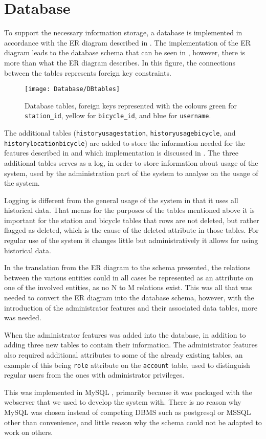 \section{Database}
To support the necessary information storage, a database is implemented in accordance with the ER diagram described in .
The implementation of the ER diagram leads to the database schema that can be seen in , however, there is more than what the ER diagram describes.
In this figure, the connections between the tables represents foreign key constraints.

\begin{figure}[h]
	\centering
	\texttt{[image: Database/DBtables]}
	\caption{Database tables, foreign keys represented with the colours green for \texttt{station_id}, yellow for \texttt{bicycle_id}, and blue for \texttt{username}.}\label{fig:Database-tables}
\end{figure}

The additional tables (\texttt{history\-usage\-station}, \texttt{history\-usage\-bicycle}, and \texttt{history\-lo\-ca\-ti\-on\-bi\-cy\-cle}) are added to store the information needed for the features described in  and which implementation is discussed in .
The three additional tables serves as a log, in order to store information about usage of the system, used by the administration part of the system to analyse on the usage of the system.

Logging is different from the general usage of the system in that it uses all historical data.
That means for the purposes of the tables mentioned above it is important for the station and bicycle tables that rows are not deleted, but rather flagged as deleted, which is the cause of the deleted attribute in those tables. 
For regular use of the system it changes little but administratively it allows for using historical data.

In the translation from the ER diagram to the schema presented, the relations between the various entities could in all cases be represented as an attribute on one of the involved entities, as no N to M relations exist.
This was all that was needed to convert the ER diagram into the database schema, however, with the introduction of the administrator features and their associated data tables, more was needed.

When the administrator features was added into the database, in addition to adding three new tables to contain their information.
The administrator features also required additional attributes to some of the already existing tables, an example of this being \texttt{role} attribute on the \texttt{account} table, used to distinguish regular users from the ones with administrator privileges.

This was implemented in MySQL \citep{misc:mysql}, primarily because it was packaged with the webserver that we used to develop the system with.
There is no reason why MySQL was chosen instead of competing DBMS such as postgresql \citep{misc:postgres} or MSSQL \citep{misc:mssql} other than convenience, and little reason why the schema could not be adapted to work on others. 